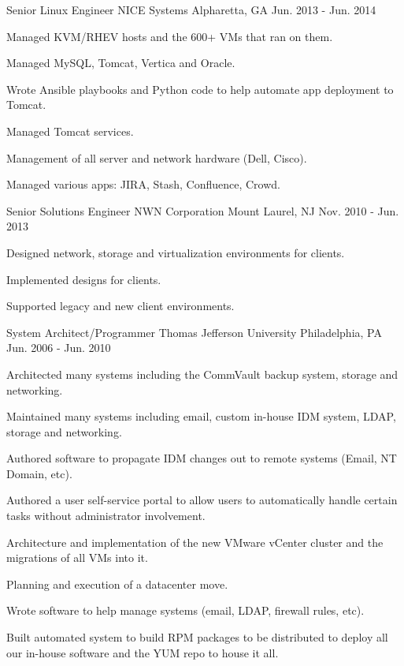 \begin{cventries}
\cventry
{Senior Linux Engineer}
{NICE Systems}
{Alpharetta, GA}
{Jun. 2013 - Jun. 2014}
{
\begin{cvitems}
\item {Managed KVM/RHEV hosts and the 600+ VMs that ran on them.}
\item {Managed MySQL, Tomcat, Vertica and Oracle.}
\item {Wrote Ansible playbooks and Python code to help automate app deployment to Tomcat.}
\item {Managed Tomcat services.}
\item {Management of all server and network hardware (Dell, Cisco).}
\item {Managed various apps: JIRA, Stash, Confluence, Crowd.}
\end{cvitems}
}

\cventry
{Senior Solutions Engineer}
{NWN Corporation}
{Mount Laurel, NJ}
{Nov. 2010 - Jun. 2013}
{
\begin{cvitems}
\item {Designed network, storage and virtualization environments for clients.}
\item {Implemented designs for clients.}
\item {Supported legacy and new client environments.}
\end{cvitems}
}

\cventry
{System Architect/Programmer}
{Thomas Jefferson University}
{Philadelphia, PA}
{Jun. 2006 - Jun. 2010}
{
\begin{cvitems}
\item {Architected many systems including the CommVault backup system, storage and networking.}
\item {Maintained many systems including email, custom in-house IDM system, LDAP, storage and networking.}
\item {Authored software to propagate IDM changes out to remote systems (Email, NT Domain, etc).}
\item {Authored a user self-service portal to allow users to automatically handle certain tasks without administrator involvement.}
\item {Architecture and implementation of the new VMware vCenter cluster and the migrations of all VMs into it.}
\item {Planning and execution of a datacenter move.}
\item {Wrote software to help manage systems (email, LDAP, firewall rules, etc).}
\item {Built automated system to build RPM packages to be distributed to deploy all our in-house software and the YUM repo to house it all.}
\end{cvitems}
}


\end{cventries}
